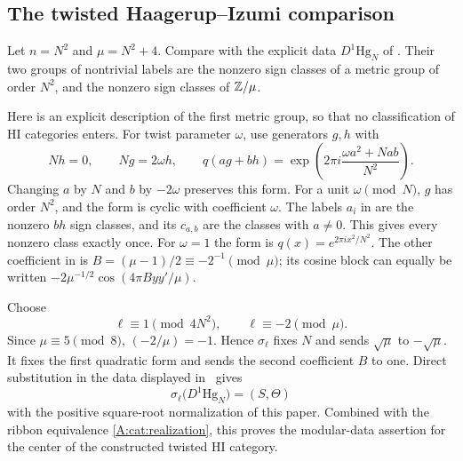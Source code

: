 \documentclass[11pt]{article}
\numberwithin{equation}{section}
\begin{document}
\subsection{The twisted Haagerup--Izumi comparison}\label{B:sec:HIcomparison}
Let $n=N^2$ and $\mu=N^2+4$. Compare with the explicit data $D^1\mathrm{Hg}_N$ of \cite[Section 3.2, equation (3.3)]{B:EG11}. Their two groups of nontrivial labels are the nonzero sign classes of a metric group of order $N^2$, and the nonzero sign classes of $\mathbb Z/\mu$.

Here is an explicit description of the first metric group, so that no classification of HI categories enters. For twist parameter $\omega$, use generators $g,h$ with
\[
 Nh=0,\qquad Ng=2\omega h,\qquad
 q(ag+bh)=\exp\!\left(2\pi i\frac{\omega a^2+Nab}{N^2}\right).
\]
Changing $a$ by $N$ and $b$ by $-2\omega$ preserves this form. For a unit $\omega\pmod N$, $g$ has order $N^2$, and the form is cyclic with coefficient $\omega$. The labels $a_i$ in \cite{B:EG11} are the nonzero $bh$ sign classes, and its $c_{a,b}$ are the classes with $a\ne0$. This gives every nonzero class exactly once. For $\omega=1$ the form is $q(x)=e^{2\pi ix^2/N^2}$. The other coefficient in \cite{B:EG11} is
$B=(\mu-1)/2\equiv-2^{-1}\pmod\mu$; its cosine block can equally be written $-2\mu^{-1/2}\cos(4\pi Byy'/\mu)$.

Choose
\begin{equation}\label{B:CRTHI}
 \ell\equiv1\pmod{4N^2},\qquad \ell\equiv-2\pmod\mu.
\end{equation}
Since $\mu\equiv5\pmod8$, $(-2/\mu)=-1$. Hence $\sigma_\ell$ fixes $N$ and sends $\sqrt\mu$ to $-\sqrt\mu$. It fixes the first quadratic form and sends the second coefficient $B$ to one. Direct substitution in the data displayed in~\cite{B:EG11} gives
\[
 \sigma_\ell\bigl(D^1\mathrm{Hg}_N\bigr)=(S,\Theta)
\]
with the positive square-root normalization of this paper. Combined with the ribbon equivalence \eqref{A:cat:realization}, this proves the modular-data assertion for the center of the constructed twisted HI category.
\end{document}
